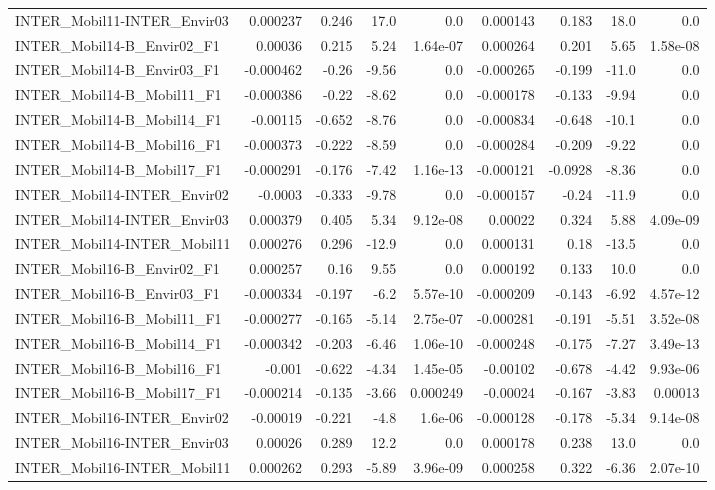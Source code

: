 \begin{tabular}{lrrrrrrrr}
INTER_Mobil11-INTER_Envir03 & 0.000237 & 0.246 & 17.0 & 0.0 & 0.000143 & 0.183 & 18.0 & 0.0 \\
INTER_Mobil14-B_Envir02_F1 & 0.00036 & 0.215 & 5.24 & 1.64e-07 & 0.000264 & 0.201 & 5.65 & 1.58e-08 \\
INTER_Mobil14-B_Envir03_F1 & -0.000462 & -0.26 & -9.56 & 0.0 & -0.000265 & -0.199 & -11.0 & 0.0 \\
INTER_Mobil14-B_Mobil11_F1 & -0.000386 & -0.22 & -8.62 & 0.0 & -0.000178 & -0.133 & -9.94 & 0.0 \\
INTER_Mobil14-B_Mobil14_F1 & -0.00115 & -0.652 & -8.76 & 0.0 & -0.000834 & -0.648 & -10.1 & 0.0 \\
INTER_Mobil14-B_Mobil16_F1 & -0.000373 & -0.222 & -8.59 & 0.0 & -0.000284 & -0.209 & -9.22 & 0.0 \\
INTER_Mobil14-B_Mobil17_F1 & -0.000291 & -0.176 & -7.42 & 1.16e-13 & -0.000121 & -0.0928 & -8.36 & 0.0 \\
INTER_Mobil14-INTER_Envir02 & -0.0003 & -0.333 & -9.78 & 0.0 & -0.000157 & -0.24 & -11.9 & 0.0 \\
INTER_Mobil14-INTER_Envir03 & 0.000379 & 0.405 & 5.34 & 9.12e-08 & 0.00022 & 0.324 & 5.88 & 4.09e-09 \\
INTER_Mobil14-INTER_Mobil11 & 0.000276 & 0.296 & -12.9 & 0.0 & 0.000131 & 0.18 & -13.5 & 0.0 \\
INTER_Mobil16-B_Envir02_F1 & 0.000257 & 0.16 & 9.55 & 0.0 & 0.000192 & 0.133 & 10.0 & 0.0 \\
INTER_Mobil16-B_Envir03_F1 & -0.000334 & -0.197 & -6.2 & 5.57e-10 & -0.000209 & -0.143 & -6.92 & 4.57e-12 \\
INTER_Mobil16-B_Mobil11_F1 & -0.000277 & -0.165 & -5.14 & 2.75e-07 & -0.000281 & -0.191 & -5.51 & 3.52e-08 \\
INTER_Mobil16-B_Mobil14_F1 & -0.000342 & -0.203 & -6.46 & 1.06e-10 & -0.000248 & -0.175 & -7.27 & 3.49e-13 \\
INTER_Mobil16-B_Mobil16_F1 & -0.001 & -0.622 & -4.34 & 1.45e-05 & -0.00102 & -0.678 & -4.42 & 9.93e-06 \\
INTER_Mobil16-B_Mobil17_F1 & -0.000214 & -0.135 & -3.66 & 0.000249 & -0.00024 & -0.167 & -3.83 & 0.00013 \\
INTER_Mobil16-INTER_Envir02 & -0.00019 & -0.221 & -4.8 & 1.6e-06 & -0.000128 & -0.178 & -5.34 & 9.14e-08 \\
INTER_Mobil16-INTER_Envir03 & 0.00026 & 0.289 & 12.2 & 0.0 & 0.000178 & 0.238 & 13.0 & 0.0 \\
INTER_Mobil16-INTER_Mobil11 & 0.000262 & 0.293 & -5.89 & 3.96e-09 & 0.000258 & 0.322 & -6.36 & 2.07e-10 \\

\end{tabular}

